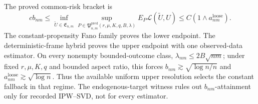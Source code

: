 The proved common-risk bracket is
\[
 c b_{nm}\le
 \inf_{\widetilde U\in\mathfrak E_{n,m}}
 \sup_{P\in\mathfrak P^{\mathrm{pred}}_{n,m}(r,\mu,K,q,B,\lambda)}
 E_P\mathcal L(\widetilde U,U)
 \le C(1\wedge a^{\mathrm{loose}}_{nm}).
\]
The constant-propensity Fano family proves the lower endpoint.  The deterministic-frame hybrid proves the upper endpoint with one observed-data estimator.  On every nonempty bounded-outcome class, \(\lambda_{nm}\le2B\sqrt{nm}\); under fixed \(r,\mu,K,q\) and bounded aspect ratio, this forces \(b_{nm}\gtrsim\sqrt{\log n/n}\) and \(a^{\mathrm{loose}}_{nm}\gtrsim\sqrt{\log n}\).  Thus the available uniform upper resolution selects the constant fallback in that regime.  The endogenous-target witness rules out \(b_{nm}\)-attainment only for recorded IPW--SVD, not for every estimator.
